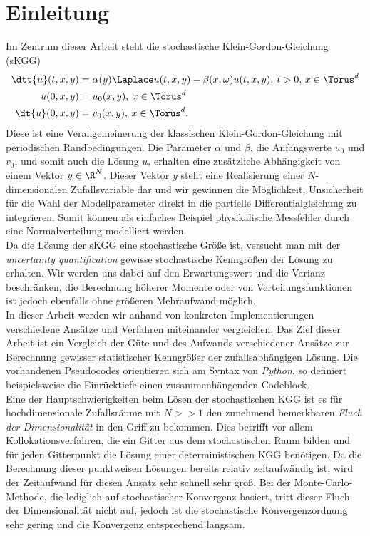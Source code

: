 
\chapter{Einleitung}
Im Zentrum dieser Arbeit steht die stochastische Klein-Gordon-Gleichung (sKGG)
\begin{align*}
\dtt{u}(t,x,y)&=\alpha(y) \Laplace u(t,x,y) - \beta(x,\omega)u(t,x,y), \: t>0, \, x\in \Torus^d\\
u(0,x,y)&=u_0(x,y), \: x\in \Torus^d\\
\dt{u}(0,x,y)&=v_0(x,y), \: x\in \Torus^d.
\end{align*}
Diese ist eine Verallgemeinerung der klassischen Klein-Gordon-Gleichung mit periodischen Randbedingungen. Die Parameter $\alpha$ und $\beta$, die Anfangswerte $u_0$ und $v_0$, und somit auch die Lösung $u$, erhalten eine zusätzliche Abhängigkeit von einem Vektor $y\in\R^N$. Dieser Vektor $y$ stellt eine Realisierung einer $N$-dimensionalen Zufallsvariable dar und wir gewinnen die Möglichkeit, Unsicherheit für die Wahl der Modellparameter direkt in die partielle Differentialgleichung zu integrieren. Somit können als einfaches Beispiel physikalische Messfehler durch eine Normalverteilung modelliert werden.\\[0.2cm]
Da die Lösung der sKGG eine stochastische Größe ist, versucht man mit der \emph{uncertainty quantification} gewisse stochastische Kenngrößen der Lösung zu erhalten. Wir werden uns dabei auf den Erwartungswert und die Varianz beschränken, die Berechnung höherer Momente oder von Verteilungsfunktionen ist jedoch ebenfalls ohne größeren Mehraufwand möglich.\\In dieser Arbeit werden wir anhand von konkreten Implementierungen verschiedene Ansätze und Verfahren miteinander vergleichen. Das Ziel dieser Arbeit ist ein Vergleich der Güte und des Aufwands verschiedener Ansätze zur Berechnung gewisser statistischer Kenngrößer der zufallsabhängigen Lösung. Die vorhandenen Pseudocodes orientieren sich am Syntax von \emph{Python}, so definiert beispielsweise die Einrücktiefe einen zusammenhängenden Codeblock.\\
Eine der Hauptschwierigkeiten beim Lösen der stochastischen KGG ist es für hochdimensionale Zufallsräume mit $N>>1$ den zunehmend bemerkbaren \emph{Fluch der Dimensionalität} in den Griff zu bekommen. Dies betrifft vor allem Kollokationsverfahren, die ein Gitter aus dem stochastischen Raum bilden und für jeden Gitterpunkt die Lösung einer deterministischen KGG benötigen. Da die Berechnung dieser punktweisen Lösungen bereits relativ zeitaufwändig ist, wird der Zeitaufwand für diesen Ansatz sehr schnell sehr groß. Bei der Monte-Carlo-Methode, die lediglich auf stochastischer Konvergenz basiert, tritt dieser Fluch der Dimensionalität nicht auf, jedoch ist die stochastische Konvergenzordnung sehr gering und die Konvergenz entsprechend langsam.\\
